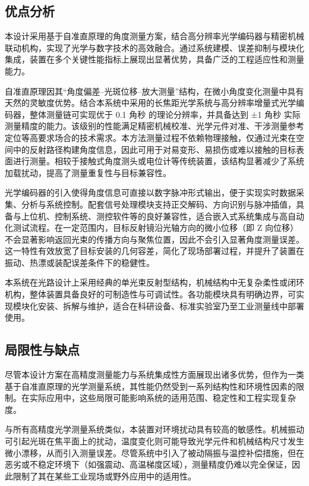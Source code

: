 \subsection{优点分析}
 
本设计采用基于自准直原理的角度测量方案，结合高分辨率光学编码器与精密机械联动机构，实现了光学与数字技术的高效融合。通过系统建模、误差抑制与模块化集成，装置在多个关键性能指标上展现出显著优势，具备广泛的工程适应性和测量能力。

自准直原理因其“角度偏差–光斑位移–放大测量”结构，在微小角度变化测量中具有天然的灵敏度优势。结合本系统中采用的长焦距光学系统与高分辨率增量式光学编码器，整体测量链可实现优于 0.1 角秒 的理论分辨率，并具备达到 ±1 角秒 实际测量精度的能力。该级别的性能满足精密机械校准、光学元件对准、干涉测量参考定位等高要求场合的技术需求。本方法测量过程不依赖物理接触，仅通过光束在空间中的反射路径构建角度信息，因此可用于对易变形、易损伤或难以接触的目标表面进行测量。相较于接触式角度测头或电位计等传统装置，该结构显著减少了系统加载扰动，提高了测量重复性与目标兼容性。

光学编码器的引入使得角度信息可直接以数字脉冲形式输出，便于实现实时数据采集、分析与系统控制。配套信号处理模块支持正交解码、方向识别与脉冲插值，具备与上位机、控制系统、测控软件等的良好兼容性，适合嵌入式系统集成与高自动化测试流程。在一定范围内，目标反射镜沿光轴方向的微小位移（即 Z 向位移）不会显著影响返回光束的传播方向与聚焦位置，因此不会引入显著角度测量误差。这一特性有效放宽了目标安装的几何容差，简化了现场部署过程，并提升了装置在振动、热漂或装配误差条件下的稳健性。

本系统在光路设计上采用经典的单光束反射型结构，机械结构中无复杂柔性或闭环机构，整体装置具备良好的可制造性与可调试性。各功能模块具有明确边界，可实现模块化安装、拆解与维护，适合在科研设备、标准实验室乃至工业测量线中部署使用。

\subsection{局限性与缺点}

尽管本设计方案在高精度测量能力与系统集成性方面展现出诸多优势，但作为一类基于自准直原理的光学测量系统，其性能仍然受到一系列结构性和环境性因素的限制。在实际应用中，这些局限可能影响系统的适用范围、稳定性和工程实现复杂度。

与所有高精度光学测量系统类似，本装置对环境扰动具有较高的敏感性。机械振动可引起光斑在焦平面上的扰动，温度变化则可能导致光学元件和机械结构尺寸发生微小漂移，从而引入测量误差。尽管系统中引入了被动隔振与温控补偿措施，但在恶劣或不稳定环境下（如强震动、高温梯度区域），测量精度仍难以完全保证，因此限制了其在某些工业现场或野外应用中的适用性。

